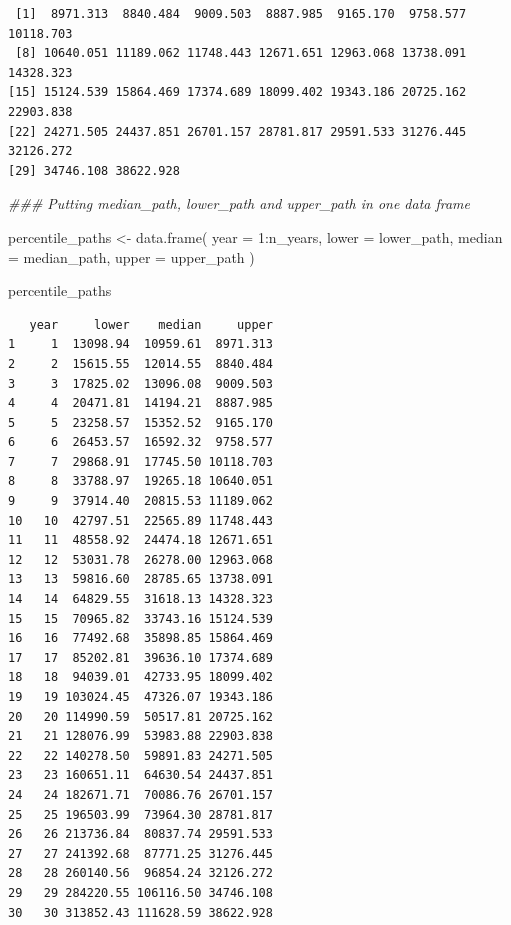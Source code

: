 \documentclass[
  letterpaper,
  DIV=11,
  numbers=noendperiod]{scrartcl}
\newenvironment{Shaded}{\begin{snugshade}}{\end{snugshade}}
\newcommand{\AttributeTok}[1]{\textcolor[rgb]{0.40,0.45,0.13}{#1}}
\newcommand{\DecValTok}[1]{\textcolor[rgb]{0.68,0.00,0.00}{#1}}
\newcommand{\DocumentationTok}[1]{\textcolor[rgb]{0.37,0.37,0.37}{\textit{#1}}}
\newcommand{\FunctionTok}[1]{\textcolor[rgb]{0.28,0.35,0.67}{#1}}
\newcommand{\NormalTok}[1]{\textcolor[rgb]{0.00,0.23,0.31}{#1}}
\newcommand{\OtherTok}[1]{\textcolor[rgb]{0.00,0.23,0.31}{#1}}
\newcommand{\SpecialCharTok}[1]{\textcolor[rgb]{0.37,0.37,0.37}{#1}}
\begin{document}
\begin{verbatim}
 [1]  8971.313  8840.484  9009.503  8887.985  9165.170  9758.577 10118.703
 [8] 10640.051 11189.062 11748.443 12671.651 12963.068 13738.091 14328.323
[15] 15124.539 15864.469 17374.689 18099.402 19343.186 20725.162 22903.838
[22] 24271.505 24437.851 26701.157 28781.817 29591.533 31276.445 32126.272
[29] 34746.108 38622.928
\end{verbatim}

\begin{Shaded}
\begin{Highlighting}[]
\DocumentationTok{\#\#\# Putting median\_path, lower\_path and upper\_path in one data frame}

\NormalTok{percentile\_paths }\OtherTok{\textless{}{-}} \FunctionTok{data.frame}\NormalTok{(}
    \AttributeTok{year =} \DecValTok{1}\SpecialCharTok{:}\NormalTok{n\_years,}
    \AttributeTok{lower =}\NormalTok{ lower\_path,}
    \AttributeTok{median =}\NormalTok{ median\_path,}
    \AttributeTok{upper =}\NormalTok{ upper\_path}
\NormalTok{)}

\NormalTok{percentile\_paths}
\end{Highlighting}
\end{Shaded}

\begin{verbatim}
   year     lower    median     upper
1     1  13098.94  10959.61  8971.313
2     2  15615.55  12014.55  8840.484
3     3  17825.02  13096.08  9009.503
4     4  20471.81  14194.21  8887.985
5     5  23258.57  15352.52  9165.170
6     6  26453.57  16592.32  9758.577
7     7  29868.91  17745.50 10118.703
8     8  33788.97  19265.18 10640.051
9     9  37914.40  20815.53 11189.062
10   10  42797.51  22565.89 11748.443
11   11  48558.92  24474.18 12671.651
12   12  53031.78  26278.00 12963.068
13   13  59816.60  28785.65 13738.091
14   14  64829.55  31618.13 14328.323
15   15  70965.82  33743.16 15124.539
16   16  77492.68  35898.85 15864.469
17   17  85202.81  39636.10 17374.689
18   18  94039.01  42733.95 18099.402
19   19 103024.45  47326.07 19343.186
20   20 114990.59  50517.81 20725.162
21   21 128076.99  53983.88 22903.838
22   22 140278.50  59891.83 24271.505
23   23 160651.11  64630.54 24437.851
24   24 182671.71  70086.76 26701.157
25   25 196503.99  73964.30 28781.817
26   26 213736.84  80837.74 29591.533
27   27 241392.68  87771.25 31276.445
28   28 260140.56  96854.24 32126.272
29   29 284220.55 106116.50 34746.108
30   30 313852.43 111628.59 38622.928
\end{verbatim}
\end{document}
